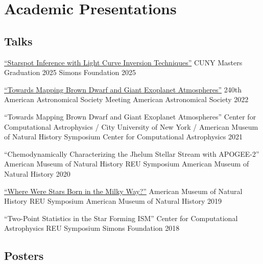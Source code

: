 \section{Academic Presentations}

\subsection*{Talks}

\begin{presentation}
{\href{https://www.youtube.com/watch?v=Ek3ERhEmccQ}{``Starspot Inference with Light Curve Inversion Techniques''}}
{CUNY Masters Graduation 2025}
{Simons Foundation}
{2025}
\end{presentation}

\begin{presentation}
{\href{https://ui.adsabs.harvard.edu/abs/2022AAS...24021703R/abstract}{``Towards Mapping Brown Dwarf and Giant Exoplanet Atmospheres''}}
{240th American Astronomical Society Meeting}
{American Astronomical Society}
{2022}
\end{presentation}

\begin{presentation}
{``Towards Mapping Brown Dwarf and Giant Exoplanet Atmospheres''}
{Center for Computational Astrophysics / City University of New York / American Museum of Natural History Symposium}
{Center for Computational Astrophysics}
{2021}
\end{presentation}

\begin{presentation}
{``Chemodynamically Characterizing the Jhelum Stellar Stream with APOGEE-2''}
{American Museum of Natural History REU Symposium}
{American Museum of Natural History}
{2020}
\end{presentation}

\begin{presentation}
{\href{https://youtu.be/mUFHpJObnoQ}{``Where Were Stars Born in the Milky Way?''}}
{American Museum of Natural History REU Symposium}
{American Museum of Natural History}
{2019}
\end{presentation}

\begin{presentation}
{``Two-Point Statistics in the Star Forming ISM''}
{Center for Computational Astrophysics REU Symposium}
{Simons Foundation}
{2018}
\end{presentation}

\subsection*{Posters}

